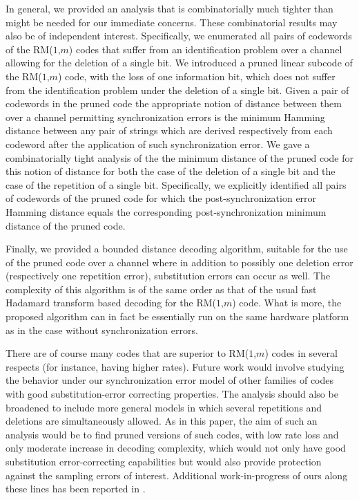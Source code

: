 In general, we provided an analysis
that is combinatorially much tighter than
might be needed for our immediate
concerns. These combinatorial results may
also be of independent interest.
Specifically, we  enumerated all pairs of codewords
of the RM($1$,$m$) codes that suffer from
an identification problem over a channel allowing
for the deletion of a single bit.
We introduced a pruned linear subcode of the
RM($1$,$m$) code,
with the loss of one information bit,
which does not suffer
from the identification problem under the
deletion of a single bit.
Given a pair of codewords in the pruned code
the appropriate notion of distance between them over
a channel permitting
synchronization errors is the minimum Hamming distance
between any
pair of strings which are derived respectively from each codeword
after the application of such synchronization error.
We gave a combinatorially tight analysis of the
the minimum distance of the pruned
code for this notion of distance for both the
case of the deletion of a single bit and the case
of the repetition of a single bit. Specifically,
we explicitly identified all pairs of codewords
of the pruned code for which the post-synchronization
error Hamming distance equals the
corresponding post-synchronization minimum distance
of the pruned code.

Finally, we provided a bounded distance
decoding algorithm,
suitable for the use of the pruned code over a channel
where in addition to possibly one deletion error
(respectively one repetition error),
substitution errors can occur as well.
The complexity of this
algorithm is of the same order as that of the usual fast Hadamard
transform based decoding for the RM($1$,$m$) code.
What is more, the proposed algorithm
can in fact be essentially run on the same hardware
platform as in the case without synchronization
errors.

There are of course many codes that are superior to
RM($1$,$m$) codes in several respects (for instance, having higher rates).
Future work would involve studying the behavior
under our synchronization error model
of other families of codes
with good substitution-error correcting properties. The analysis
should also be broadened to include more general models in which
several repetitions and deletions are
simultaneously allowed. As in this paper, the aim of such an
analysis would be to find pruned versions of such
codes, with low rate loss and only moderate increase in
decoding complexity, which would not only
have good substitution error-correcting capabilities but would also
provide protection against the sampling errors of interest.
Additional work-in-progress of ours
along these lines has been reported in
\cite{daArrayTech:06}.

